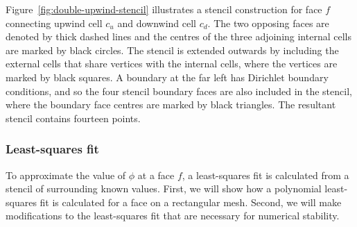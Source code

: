 Figure~\ref{fig:double-upwind-stencil} illustrates a stencil construction for face $f$ connecting upwind cell $c_u$ and downwind cell $c_d$.  The two opposing faces are denoted by thick dashed lines and the centres of the three adjoining internal cells are marked by black circles.  The stencil is extended outwards by including the external cells that share vertices with the internal cells, where the vertices are marked by black squares.  A boundary at the far left has Dirichlet boundary conditions, and so the four stencil boundary faces are also included in the stencil, where the boundary face centres are marked by black triangles.  The resultant stencil contains fourteen points.

\subsubsection{Least-squares fit}
To approximate the value of $\phi$ at a face $f$, a least-squares fit is calculated from a stencil of surrounding known values.  First, we will show how a polynomial least-squares fit is calculated for a face on a rectangular mesh.  Second, we will make modifications to the least-squares fit that are necessary for numerical stability.  


